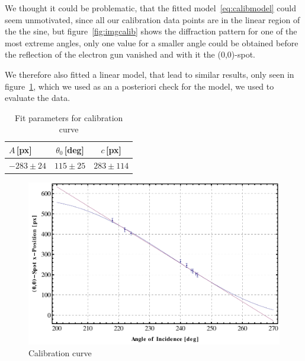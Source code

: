 \documentclass[a4paper,10pt]{scrartcl}
\begin{document}
We thought it could be problematic, that the fitted model~\eqref{eq:calibmodel} could seem unmotivated, since all our calibration data points are in the linear region of the the sine, but figure~\ref{fig:imgcalib} shows the diffraction pattern for one of the most extreme angles, only one value for a smaller angle could be obtained before the reflection of the electron gun vanished and with it the (0,0)-spot. 

We therefore also fitted a linear model, that lead to similar results, only seen in figure~\ref{fig:calib}, which we used as an a posteriori check for the model, we used to evaluate the data.

\begin{table}
\begin{center}
\begin{tabular}{lcc}
\toprule
$A$\,[px] & $\theta_{0}$\,[deg] & $c$\,[px] \\
\midrule
$-283 \pm 24$ & $115 \pm 25$  & $283 \pm 114$ \\
\bottomrule
\end{tabular}
\end{center}
\par
\caption{Fit parameters for calibration curve \label{tab:calibdata}}
\end{table}

\begin{figure}
\centering
\includegraphics[scale=0.55]{img/calib}
\caption{Calibration curve \label{fig:calib}}
\end{figure}
\end{document}
